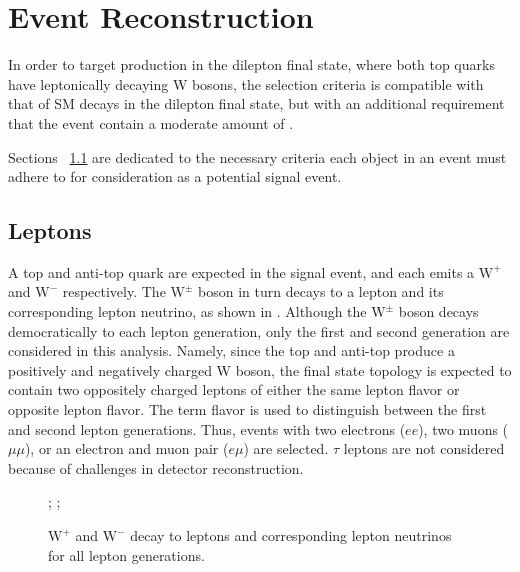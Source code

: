 \chapter{Event Reconstruction}
\label{chap:eventreco}

In order to target \ttDM production in the dilepton final state, where both top quarks have leptonically decaying W bosons, the selection criteria is compatible with that of SM \ttbar decays in the dilepton final state, but with an additional requirement that the event contain a moderate amount of \MET.

Sections ~\ref{sec:leps} are dedicated to the necessary criteria each object in an event must adhere to for consideration as a potential signal event.

\section{Leptons}
\label{sec:leps}
A top and anti-top quark are expected in the signal event, and each emits a $\mathrm{W^+}$ and $\mathrm{W^-}$ respectively. The $\mathrm{W^\pm}$ boson in turn decays to a lepton and its corresponding lepton neutrino, as shown in . Although the $\mathrm{W^\pm}$ boson decays democratically to each lepton generation, only the first and second generation are considered in this analysis. Namely, since the top and anti-top produce a positively and negatively charged W boson, the final state topology is expected to contain two oppositely charged leptons of either the same lepton flavor or opposite lepton flavor. The term flavor is used to distinguish between the first and second lepton generations. Thus, events with two electrons ($ee$), two muons ($\mu\mu$), or an electron and muon pair ($e\mu$) are selected. $\tau$ leptons are not considered because of challenges in detector reconstruction. 

\begin{figure}
  ;
  ;
  \caption{$\mathrm{W^+}$ and $\mathrm{W^-}$ decay to leptons and corresponding lepton neutrinos for all lepton generations.}
  \label{fig:Wdecay}
\end{figure}

